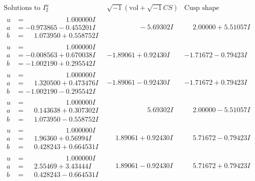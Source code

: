 \documentclass[1p]{elsarticle_modified}
\theoremstyle{definition}
\newcommand{\I}{\sqrt{-1}}
\begin{document}
$$\begin{array}{c|c|c}  
\text{Solutions to }I^u_{2}& \I (\text{vol} + \sqrt{-1}CS) & \text{Cusp shape}\\
 \hline 
\begin{aligned}
u &= \phantom{-0.000000 -}1.000000 I \\
a &= -0.973865 - 0.455201 I \\
b &= \phantom{-}1.073950 + 0.558752 I\end{aligned}
 & \phantom{-0.000000 } -5.69302 I & \phantom{-}2.00000 + 5.51057 I \\ \hline\begin{aligned}
u &= \phantom{-0.000000 -}1.000000 I \\
a &= -0.008563 + 0.670038 I \\
b &= -1.002190 + 0.295542 I\end{aligned}
 & -1.89061 + 0.92430 I & -1.71672 - 0.79423 I \\ \hline\begin{aligned}
u &= \phantom{-0.000000 -}1.000000 I \\
a &= \phantom{-}1.320500 + 0.473476 I \\
b &= -1.002190 - 0.295542 I\end{aligned}
 & -1.89061 - 0.92430 I & -1.71672 + 0.79423 I \\ \hline\begin{aligned}
u &= \phantom{-0.000000 -}1.000000 I \\
a &= \phantom{-}0.143638 + 0.307302 I \\
b &= \phantom{-}1.073950 - 0.558752 I\end{aligned}
 & \phantom{-0.000000 -}5.69302 I & \phantom{-}2.00000 - 5.51057 I \\ \hline\begin{aligned}
u &= \phantom{-0.000000 -}1.000000 I \\
a &= \phantom{-}1.96360 + 0.56994 I \\
b &= \phantom{-}0.428243 + 0.664531 I\end{aligned}
 & \phantom{-}1.89061 + 0.92430 I & \phantom{-}5.71672 - 0.79423 I \\ \hline\begin{aligned}
u &= \phantom{-0.000000 -}1.000000 I \\
a &= \phantom{-}2.55469 + 3.43444 I \\
b &= \phantom{-}0.428243 - 0.664531 I\end{aligned}
 & \phantom{-}1.89061 - 0.92430 I & \phantom{-}5.71672 + 0.79423 I \\ \hline\begin{aligned}

\end{aligned}
\end{array}$$
\end{document}

